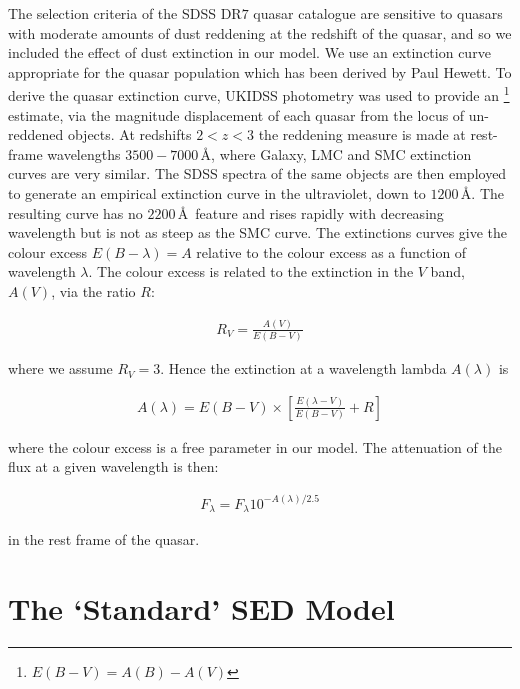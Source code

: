 The selection criteria of the SDSS DR$7$ quasar catalogue are sensitive to quasars with moderate amounts of dust reddening at the redshift of the quasar, and so we included the effect of dust extinction in our model. 
We use an extinction curve appropriate for the quasar population which has been derived by Paul Hewett. 
To derive the quasar extinction curve, UKIDSS photometry was used to provide an \ebv\footnote{$E(B-V)=A(B)-A(V)$} estimate, via the magnitude displacement of each quasar from the locus of un-reddened objects. 
At redshifts $2 < z < 3$ the reddening measure is made at rest-frame wavelengths $3500-7000$\,\AA, where Galaxy, LMC and SMC extinction curves are very similar. 
The SDSS spectra of the same objects are then employed to generate an empirical extinction curve in the ultraviolet, down to $1200$\,\AA. 
The resulting curve has no $2200$\,\AA\, feature and rises rapidly with decreasing wavelength but is not as steep as the SMC curve. 
The extinctions curves give the colour excess $E(B-\lambda) = A$ relative to the colour excess \ebv as a function of wavelength $\lambda$. 
The colour excess \ebv is related to the extinction in the $V$ band, $A(V)$, via the ratio $R$: 

\begin{eqnarray}
  R_V = \frac{A(V)}{E(B-V)}
\end{eqnarray}

where we assume $R_V = 3$. 
Hence the extinction at a wavelength lambda $A(\lambda)$ is 

\begin{eqnarray}
  A(\lambda) = E(B-V) \times \left[ \frac{E(\lambda-V)}{E(B-V)} + R \right] 
\end{eqnarray}

where the colour excess \ebv is a free parameter in our model. 
The attenuation of the flux at a given wavelength is then:

\begin{eqnarray}
  F_\lambda = F_\lambda10^{-A(\lambda)/2.5}
\end{eqnarray}

in the rest frame of the quasar. 

\section{The `Standard' SED Model} 
\label{sec:ch5-standardmodel}

